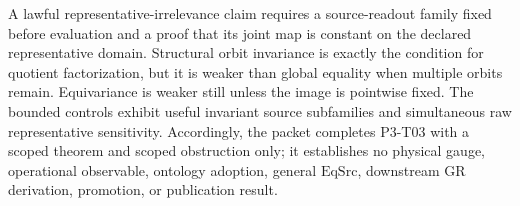 \documentclass[11pt]{article}
\theoremstyle{definition}
\newcommand{\EqSrc}{\ensuremath{\mathrm{EqSrc}}}
\begin{document}
A lawful representative-irrelevance claim requires a source-readout family
fixed before evaluation and a proof that its joint map is constant on the
declared representative domain.  Structural orbit invariance is exactly the
condition for quotient factorization, but it is weaker than global equality
when multiple orbits remain.  Equivariance is weaker still unless the image is
pointwise fixed.  The bounded controls exhibit useful invariant source
subfamilies and simultaneous raw representative sensitivity.  Accordingly,
the packet completes P3-T03 with a scoped theorem and scoped obstruction only;
it establishes no physical gauge, operational observable, ontology adoption,
general \EqSrc{}, downstream GR derivation, promotion, or publication result.
\end{document}
